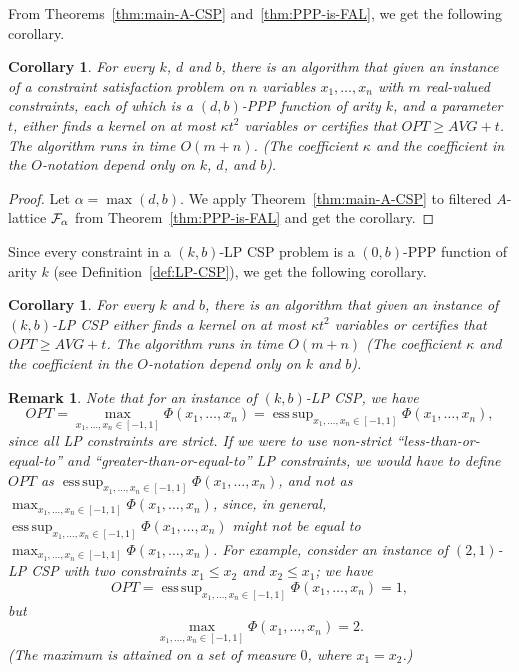 \documentclass[11pt]{article}
\DeclareMathOperator*{\esssup}{ess\,sup}
\newcommand {\calF}   {{\cal{F}}}
\newtheorem{corollary}[theorem]{Corollary}
\newtheorem{remark}[theorem]{Remark}
\begin{document}
From Theorems~\ref{thm:main-A-CSP} and~\ref{thm:PPP-is-FAL}, we get the following corollary.
\begin{corollary}
For every $k$, $d$ and $b$, there is an algorithm that given an instance of a constraint satisfaction problem on $n$ variables $x_1,\dots,x_n$
with $m$ real-valued constraints, each of which is a $(d,b)$-PPP function of arity $k$, and a parameter $t$,
either finds a kernel on at most $\kappa t^2$ variables or certifies that $OPT \geq  AVG + t$.
The algorithm runs in time $O(m+n)$. (The coefficient $\kappa$ and the coefficient in the $O$-notation depend only on $k$, $d$, and $b$).
\end{corollary}
\begin{proof}
Let $\alpha = \max(d, b)$.
We apply Theorem~\ref{thm:main-A-CSP} to filtered $A$-lattice $\calF_{\alpha}$ from Theorem~\ref{thm:PPP-is-FAL} and get the corollary.
\end{proof}

\smallskip
Since every constraint in a  $(k,b)$-LP CSP problem is a $(0,b)$-PPP function of arity $k$ (see Definition~\ref{def:LP-CSP}), we get the following corollary.
\begin{corollary}
For every $k$ and $b$, there is an algorithm that given an instance of $(k,b)$-LP CSP
either finds a kernel on at most $\kappa t^2$ variables
or certifies that $OPT \geq  AVG + t$.
The algorithm runs in time $O(m+n)$ (The coefficient $\kappa$ and the coefficient in the $O$-notation depend only on $k$ and $b$).
\end{corollary}
\begin{remark}
Note that for an instance of $(k,b)$-LP CSP, we have
$$OPT = \max_{x_1,\dots,x_n\in[-1,1]} \Phi(x_1,\dots, x_n) =  \esssup_{x_1,\dots,x_n\in[-1,1]} \Phi(x_1,\dots, x_n),$$
since all LP constraints are strict. If we were to use non-strict ``less-than-or-equal-to'' and ``greater-than-or-equal-to'' LP constraints, we would
have to define
$OPT$ as  $\esssup_{x_1,\dots,x_n\in[-1,1]} \Phi(x_1,\dots, x_n)$, and not as $\max_{x_1,\dots,x_n\in[-1,1]} \Phi(x_1,\dots, x_n)$,
since, in general, $\esssup_{x_1,\dots,x_n\in[-1,1]} \Phi(x_1,\dots, x_n)$ might not be equal to $\max_{x_1,\dots,x_n\in[-1,1]} \Phi(x_1,\dots, x_n)$.
For example, consider an instance of $(2,1)$-LP CSP with two constraints $x_1 \leq x_2$ and $x_2 \leq x_1$; we have
$$OPT = \esssup_{x_1,\dots,x_n\in[-1,1]} \Phi(x_1,\dots, x_n) = 1,$$
but
$$\max_{x_1,\dots,x_n\in[-1,1]} \Phi(x_1,\dots, x_n) = 2.$$
(The maximum is attained on a set of measure $0$, where $x_1 = x_2$.)
\end{remark}
 
\end{document}
